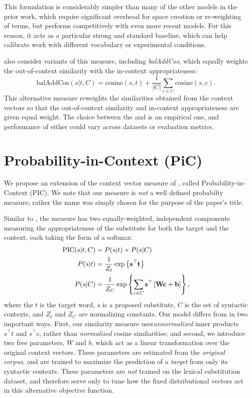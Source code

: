 This formulation is considerably simpler than many of the other models
in the prior work, which require significant overhead for space creation
or re-weighting of terms, but performs competitively with even more recent
models. For this reason, it acts as a particular strong and standard baseline,
which can help calibrate work with different vocabulary or experimental
conditions.

 also consider variants of this measure, including
{\em balAddCos}, which equally weights the out-of-context similarity with the
in-context appropriateness:
\begin{equation}
  \text{balAddCos}(s|t,C) = \text{cosine}(s, t) + \frac{1}{|C|}\sum_{c\in C} \text{cosine}(s, c).
\end{equation}
This alternative measure reweights the similarities obtained from the context
vectors so that the out-of-context similarity and in-context appropriateness
are given equal weight. The choice between the \addCos and \balAddCos is
an empirical one, and performance of either could vary across datasets or
evaluation metrics.

\section{Probability-in-Context (PiC)}

We propose an extension of the context vector measure of
, called Probability-in-Context (PIC).  We note that
our measure is {\em not} a well defined probabilty measure; rather the name was
simply chosen for the purpose of the paper's title.

Similar to \balAddCos, the measure has two equally-weighted, independent
components measuring the appropriateness of the substitute for both the target
and the context, each taking the form of a softmax:
\begin{equation}
  \begin{aligned}
  \mbox{PIC}(s | t, C) &= P(s | t) \times P(s | C)\\
  P(s | t) &= \frac{1}{Z_t}\exp\left\{{\mathbf{s}}^\top {\mathbf{t}}\right\}\\
  P(s | C) &= \frac{1}{Z_C}\exp\left\{\sum_{c\in C}{\mathbf{s}}^\top\left[{{\mathbf{W}}}{\mathbf{c}} + {\mathbf{b}}\right]\right\},
  \end{aligned}
  \label{eqn:pic}
\end{equation}
where the $t$ is the target word, $s$ is a proposed substitute, $C$ is the set
of syntactic contexts, and $Z_t$ and $Z_C$ are normalizing constants. Our
model differs from \mbox{\balAddCos} in two important ways. First, our
similarity measure uses{\em unnormalized} inner products $s^\top t$
and $s^\top c$, rather than {\em normalized} cosine similarities; and
second, we introduce two  free parameters, $W$ and $b$, which act as a linear
transformation over the original context vectors. These parameters are
estimated from the {\em original corpus}, and are trained to maximize the
prediction of a {\em target} from only its syntactic contexts. These parameters
are {\em not} trained on the lexical substitution dataset, and
therefore serve only to tune how the fixed distributional vectors act in this
alternative objective function.

